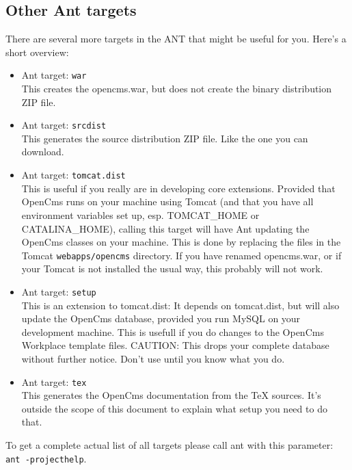 \subsection{Other Ant targets}

There are several more targets in the ANT that might be useful for you.
Here's a short overview:

\begin{itemize}
\item Ant target: \texttt{war}\\
This creates the opencms.war, but does not create the binary distribution 
ZIP file.

\item Ant target: \texttt{srcdist}\\
This generates the source distribution ZIP file. Like the one you 
can download. 

\item Ant target: \texttt{tomcat.dist}\\
This is useful if you really are in developing core extensions. Provided
that OpenCms runs on your machine using Tomcat (and that you have all 
environment variables set up, esp. TOMCAT\_HOME or CATALINA\_HOME), calling 
this target will have Ant updating the OpenCms classes on your machine. 
This is done by replacing the files in the Tomcat \texttt{webapps/opencms} directory.
If you have renamed opencms.war, or if your Tomcat is not installed the 
usual way, this probably will not work.

\item Ant target: \texttt{setup}\\
This is an extension to tomcat.dist: It depends on tomcat.dist, but will 
also update the OpenCms database, provided you run MySQL on your development
machine. This is usefull if you do changes to the OpenCms Workplace template
files. CAUTION: This drops your complete database without further notice. 
Don't use until you know what you do. 

\item Ant target: \texttt{tex}\\
This generates the OpenCms documentation from the TeX sources. It's outside 
the scope of this document to explain what setup you need to do that.

\end{itemize}

To get a complete actual list of all targets please call ant with this parameter:\\
\texttt{ant -projecthelp}.

